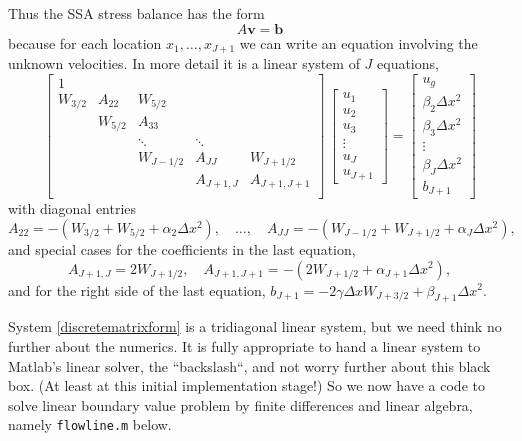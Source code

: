 \documentclass[titlepage,letterpaper,final,12pt]{scrartcl}
\begin{document}
Thus the SSA stress balance has the form
  $$A \mathbf{v} = \mathbf{b}$$
because for each location $x_1,\dots,x_{J+1}$ we can write an equation involving the unknown velocities.  In more detail it is a linear system of $J$ equations,
\begin{equation}
\begin{bmatrix}
1 &  &  &  &  \\
W_{3/2} & A_{22} & W_{5/2} &  &  \\
 & W_{5/2} & A_{33} &  &  \\
 &  & \ddots & \ddots &  \\
 &  & W_{J-1/2} & A_{JJ} & W_{J+1/2} \\
 &  &  & A_{J+1,J} & A_{J+1,J+1} \\
\end{bmatrix}\,
\begin{bmatrix}
u_1 \\ u_2 \\ u_3 \\ \vdots \\ u_J \\ u_{J+1}
\end{bmatrix}
=
\begin{bmatrix}
u_g \\ \beta_2 \Delta x^2 \\ \beta_3 \Delta x^2 \\ \vdots \\ \beta_J \Delta x^2 \\ b_{J+1}
\end{bmatrix}  \label{discretematrixform}
\end{equation}
with diagonal entries
  $$A_{22} = -(W_{3/2}+W_{5/2}+\alpha_2 \Delta x^2), \quad \dots, \quad A_{JJ} = -(W_{J-1/2}+W_{J+1/2}+\alpha_J \Delta x^2),$$
and special cases for the coefficients in the last equation,
  $$A_{J+1,J} = 2 W_{J+1/2}, \quad A_{J+1,J+1} = -(2 W_{J+1/2}+\alpha_{J+1}\Delta x^2),$$
and for the right side of the last equation, $b_{J+1} = -2 \gamma \Delta x W_{J+3/2} + \beta_{J+1} \Delta x^2$.

System \eqref{discretematrixform} is a tridiagonal linear system, but we need think no further about the numerics.  It is fully appropriate to hand a linear system to Matlab's linear solver, the ``backslash``, and not worry further about this black box.  (At least at this initial implementation stage!)  So we now have a code to solve linear boundary value problem by finite differences and linear algebra, namely \texttt{flowline.m} below.
\end{document}
